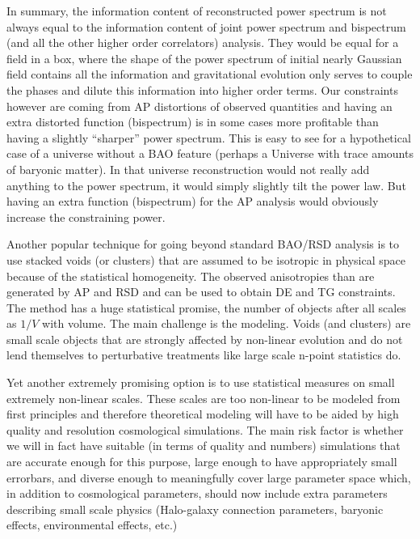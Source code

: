 In summary, the information content of reconstructed power spectrum is not
always equal to the information content of joint power spectrum and bispectrum
(and all the other higher order correlators) analysis. They would be equal for
a field in a box, where the shape of the power spectrum of initial nearly
Gaussian field contains all the information and gravitational evolution only
serves to couple the phases and dilute this information into higher order
terms. Our constraints however are coming from AP distortions of observed
quantities and having an extra distorted function (bispectrum) is in some cases
more profitable than having a slightly ``sharper'' power spectrum. This is easy
to see for a hypothetical case of a universe without a BAO feature (perhaps a
Universe with trace amounts of baryonic matter). In that universe
reconstruction would not really add anything to the power spectrum, it would
simply slightly tilt the power law. But having an extra function (bispectrum)
for the AP analysis would obviously increase the constraining power.

Another popular technique for going beyond standard BAO/RSD analysis is to use
stacked voids (or clusters) that are assumed to be isotropic in physical space
because of the statistical homogeneity. The observed anisotropies than are
generated by AP and RSD and can be used to obtain DE and TG constraints. The
method has a huge statistical promise, the number of objects after all scales
as $1/V$ with volume. The main challenge is the modeling. Voids (and clusters)
are small scale objects that are strongly affected by non-linear evolution and
do not lend themselves to perturbative treatments like large scale n-point
statistics do.

Yet another extremely promising option is to use statistical measures on small
extremely non-linear scales. These scales are too non-linear to be modeled from
first principles and therefore theoretical modeling will have to be aided by
high quality and resolution cosmological simulations. The main risk factor is
whether we will in fact have suitable (in terms of quality and numbers)
simulations that are accurate enough for this purpose, large enough to have
appropriately small errorbars, and diverse enough to meaningfully cover large
parameter space which, in addition to cosmological parameters, should now
include extra parameters describing small scale physics (Halo-galaxy connection
parameters, baryonic effects, environmental effects, etc.)

